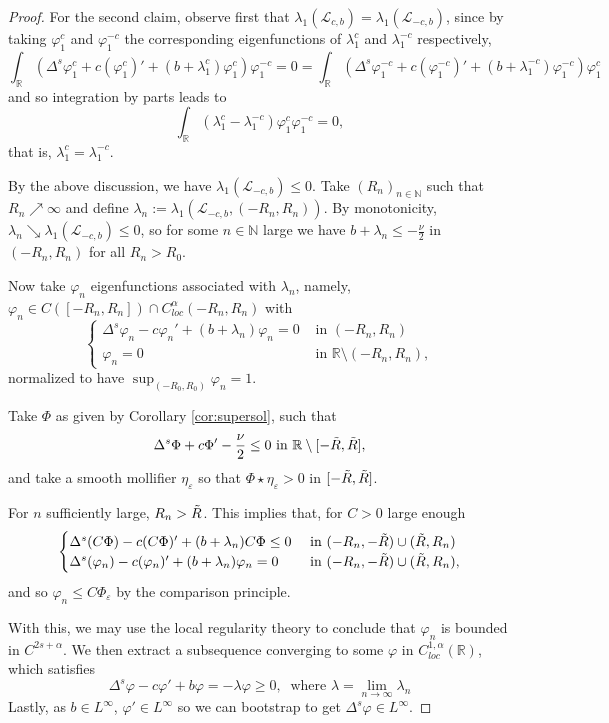\documentclass[11pt,a4paper]{amsart}
\newcommand{\Lop}{\mathcal{L}}
\newcommand{\R}{\mathbb{R}}
\newcommand{\inSet}[1]{\text{ in } {#1}}
\newcommand{\N}{\mathbb{N}}
\renewcommand{\phi}{\varphi}
\renewcommand{\epsilon}{\varepsilon}
\begin{document}
\begin{proof}
For the second claim, observe first that $\lambda_1(\Lop_{c,b}) = \lambda_1(\Lop_{-c,b})$, since by taking $\phi_1^c$ and $\phi_1^{-c}$ the corresponding eigenfunctions of $\lambda_1^c$ and $\lambda_1^{-c}$ respectively,
\[\int_{\R} (\Delta^s \phi_1^c + c(\phi_1^c)' + (b + \lambda_1^c)\phi_1^c) \phi_1^{-c} = 0 =\int_{\R} (\Delta^s \phi_1^{-c} + c(\phi_1^{-c})' + (b + \lambda_1^{-c})\phi_1^{-c}) \phi_1^c\]
 and so integration by parts leads to
 \[\int_{\R} (\lambda_1^c - \lambda_1^{-c}) \phi_1^c\phi_1^{-c} =0, \]
 that is, $\lambda_1^{c} = \lambda_1^{-c}$.
 
By the above discussion, we have $\lambda_1(\Lop_{-c,b})\leq 0$. Take $(R_n)_{n\in\N}$ such that $R_n\nearrow\infty$ and define $\lambda_n := \lambda_1(\Lop_{-c,b}, (-R_n, R_n))$. By monotonicity,  $\lambda_n  \searrow \lambda_1(\Lop_{-c,b})\leq 0$, so for some $n\in\N$ large we have $b + \lambda_n \leq -\frac{\nu}{2}$ in $(-R_n, R_n)$ for all $R_n > R_0$.

Now take $\phi_n$ eigenfunctions associated with $\lambda_n$, namely, $\phi_n \in C([-R_n, R_n]) \cap C_{loc}^{\alpha}(-R_n,R_n)$ with
\[\begin{cases}
\Delta^s \phi_n - c \phi_n' + (b + \lambda_n) \phi_n =0 & \inSet{(-R_n,R_n)}\\
\phi_n = 0  & \inSet{\R\setminus(-R_n,R_n)},
\end{cases}\]
normalized to have $\sup_{(-R_0, R_0)} \phi_n = 1$. 

Take $\Phi$ as given by Corollary \ref{cor:supersol}, such that 
\[\Delta^s\Phi + c \Phi' - \frac{\nu}{2}\leq 0 \text{ in }\R\setminus[-\Tilde{R}, \Tilde{R}],\]
and take a smooth mollifier $\eta_{\epsilon}$ so that $\Phi \star \eta_{\epsilon} > 0$ in $[-\Tilde{R}, \Tilde{R}]$. 

For $n$ sufficiently large, $R_n > \Tilde{R}$. This implies that, for $C>0$ large enough
\[\begin{cases}
\Delta^s(C\Phi) - c(C\Phi)' + (b+\lambda_n) C\Phi \leq 0 & \text{ in } (-R_n, -\Tilde{R}) \cup  (\Tilde{R}, R_n) \\
\Delta^s(\phi_n) - c(\phi_n)' + (b+\lambda_n) \phi_n = 0 & \text{ in } (-R_n, -\Tilde{R}) \cup  (\Tilde{R}, R_n),
\end{cases}\] 
and so $\phi_n \leq C\Phi_{\epsilon}$ by the comparison principle.

With this, we may use the local regularity theory to conclude that $\phi_n$ is bounded in $C^{2s + \alpha}$. We then extract a subsequence converging to some $\phi$ in $C^{1,\alpha}_{loc}(\R)$, which satisfies
\[\Delta^s \phi - c\phi' + b\phi = - \lambda \phi \geq 0,~\text{ where } \lambda = \lim_{n\rightarrow \infty} \lambda_n\]
Lastly, as $b\in L^{\infty}$, $\phi' \in L^{\infty}$ so we can bootstrap to get $\Delta^s \phi \in L^{\infty}$.
\end{proof}
\end{document}

